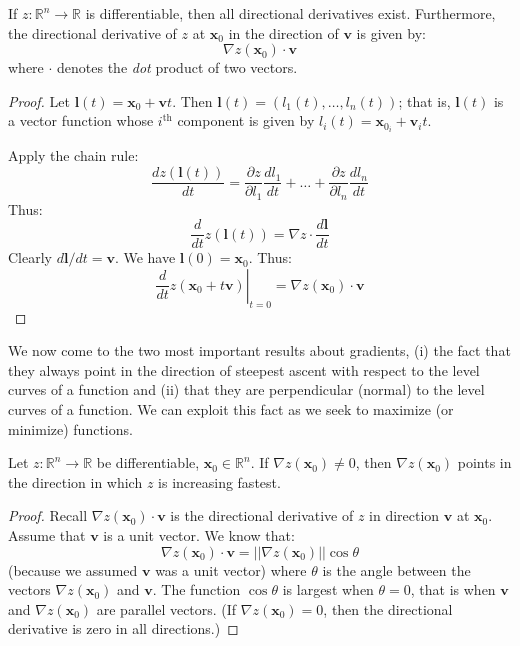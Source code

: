 \begin{theorem} If $z:\mathbb{R}^n \rightarrow \mathbb{R}$ is differentiable, then all directional derivatives exist. Furthermore, the directional derivative of $z$ at $\mathbf{x}_0$ in the direction of $\mathbf{v}$ is given by:
\begin{equation}
\nabla z(\mathbf{x}_0) \cdot \mathbf{v}
\end{equation}
where $\cdot$ denotes the \textit{dot} product of two vectors.
\end{theorem}
\begin{proof} Let $\mathbf{l}(t) = \mathbf{x}_0 + \mathbf{v}t$. Then $\mathbf{l}(t) = (l_1(t),\dots,l_n(t))$; that is, $\mathbf{l}(t)$ is a vector function whose $i^{\text{th}}$ component is given by $l_i(t) = \mathbf{x}_{0_i} + \mathbf{v}_it$. 

Apply the chain rule:
\begin{equation}
\frac{dz(\mathbf{l}(t))}{dt} = 
	\frac{\partial z}{\partial l_1}\frac{dl_1}{dt} + \dots + 
	\frac{\partial z}{\partial l_n}\frac{dl_n}{dt}
\end{equation}
Thus:
\begin{equation}
\frac{d}{dt}z(\mathbf{l}(t)) = \nabla z\cdot\frac{d\mathbf{l}}{dt}
\end{equation}
Clearly $d\mathbf{l}/dt = \mathbf{v}$. We have $\mathbf{l}(0) = \mathbf{x}_0$. Thus:
\begin{equation}
\left.\frac{d}{dt}z(\mathbf{x}_0 + t\mathbf{v})\right\vert_{t=0} = 
	\nabla z(\mathbf{x}_0) \cdot \mathbf{v}
\end{equation}
\end{proof}

We now come to the two most important results about gradients, (i) the fact that they always point in the direction of steepest ascent with respect to the level curves of a function and (ii) that they are perpendicular (normal) to the level curves of a function. We can exploit this fact as we seek to maximize (or minimize) functions.

\begin{theorem} Let $z:\mathbb{R}^n \rightarrow \mathbb{R}$ be differentiable, $\mathbf{x}_0 \in \mathbb{R}^n$. If $\nabla z(\mathbf{x}_0) \neq 0$, then $\nabla z(\mathbf{x}_0)$ points in the direction in which $z$ is increasing fastest.
\end{theorem}
\begin{proof} Recall $\nabla z(\mathbf{x}_0)\cdot \mathbf{v}$ is the directional derivative of $z$ in direction $\mathbf{v}$ at $\mathbf{x}_0$. Assume that $\mathbf{v}$ is a unit vector. We know that:
\begin{equation}
\nabla z(\mathbf{x}_0)\cdot \mathbf{v}  = ||\nabla z(\mathbf{x}_0)||\cos\theta
\end{equation}
(because we assumed $\mathbf{v}$ was a unit vector) where $\theta$ is the angle between the vectors $\nabla z(\mathbf{x}_0)$ and $\mathbf{v}$. The function $\cos\theta$ is largest when $\theta = 0$, that is when $\mathbf{v}$ and $\nabla z(\mathbf{x}_0)$ are parallel vectors. (If $\nabla z(\mathbf{x}_0) = 0$, then the directional derivative is zero in all directions.)
\end{proof}

